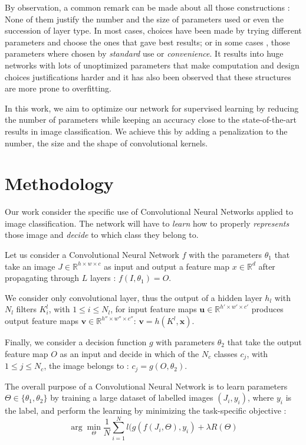 \documentclass{winnower}
\begin{document}
By observation, a common remark can be made about all those constructions : None of them justify the number and the size of parameters used or even the succession of layer type. In most cases, choices have been made by trying different parameters and choose the ones that gave best results; or in some cases \cite{szegedy2015going}, those parameters where chosen by \textit{standard} use or \textit{convenience}. It results into huge networks with lots of unoptimized parameters that make computation and design choices justifications harder and it has also been observed that these structures are more prone to overfitting. 

In this work, we aim to optimize our network for supervised learning by reducing the number of parameters while keeping an accuracy close to the state-of-the-art results in image classification. We achieve this by adding a penalization to the number, the size and the shape of convolutional kernels.

\section{Methodology} 
Our work consider the specific use of Convolutional Neural Networks applied to image classification. The network will have to \textit{learn} how to properly \textit{represents} those image and \textit{decide} to which class they belong to.

Let us consider a Convolutional Neural Network $f$ with the parameters  $\theta_1$ that take an image $J \in \mathbb{R}^{h \times w \times c}$ as input and output a feature map $x \in \mathbb{R}^{d}$ after propagating through $L$ layers  : $f(I, \theta_1) = O$. 

We consider only convolutional layer, thus the output of a hidden layer $h_l$ with $N_l$ filters $K^l_i$, with $1 \leq i \leq N_l$, for input feature maps $\textbf{u} \in \mathbb{R}^{h' \times w' \times c'}$ produces output feature maps $\textbf{v} \in \mathbb{R}^{h'' \times w'' \times c''}$: $\textbf{v} = h(K^l, \textbf{x})$. 

Finally, we consider a decision function $g$ with parameters $\theta_2$ that take the output feature map $O$ as an input and decide in which of the $N_c$ classes $c_j$, with $1 \leq j \leq N_c $, the image belongs to : $c_j = g(O,\theta_2)$.

The overall purpose of a Convolutional Neural Network is to learn parameters $\Theta \in \{ \theta_1, \theta_2 \}$ by training a large dataset of labelled images $(J_i, y_i)$, where $y_i$ is the label, and perform the learning by minimizing the task-specific objective :
\[
	\arg\!\min_{\Theta} \dfrac{1}{N} \sum_{i=1}^N l(g(f(J_i, \Theta), y_i) + \lambda R(\Theta) 
\]
\end{document}
